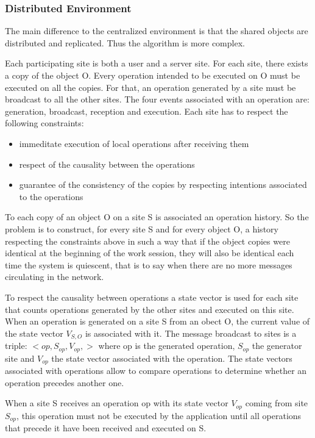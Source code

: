\subsubsection{Distributed Environment}
The main difference to the centralized environment is that the shared objects are distributed and replicated. Thus the algorithm is more complex.

Each participating site is both a user and a server site. For each site, there exists a copy of the object O. Every operation intended to be executed on O must be executed on all the copies. For that, an operation generated by a site must be broadcast to all the other sites. The four events associated with an operation are: generation, broadcast, reception and execution.
Each site has to respect the following constraints:
\begin{itemize}
 \item immeditate execution of local operations after receiving them
 \item respect of the causality between the operations
 \item guarantee of the consistency of the copies by respecting intentions associated to the operations
\end{itemize}
To each copy of an object O on a site S is associated an operation history. So the problem is to construct, for every site S and for every object O, a history respecting the constraints above in such a way that if the object copies were identical at the beginning of the work session, they will also be identical each time the system is quiescent, that is to say when there are no more messages circulating in the network.

To respect the causality between operations a state vector is used for each site that counts operations generated by the other sites and executed on this site. When an operation is generated on a site S from an obect O, the current value of the state vector $V_{S,O}$ is associated with it. The message broadcast to sites is a triple: $<op,S_{op},V_{op},>$ where op is the generated operation, $S_{op}$ the generator site and $V_{op}$ the state vector associated with the operation. The state vectors associated with operations allow to compare operations to determine whether an operation precedes another one.

When a site S receives an operation op with its state vector $V_{op}$ coming from site $S_{op}$, this operation must not be executed by the application until all operations that precede it have been received and executed on S.

